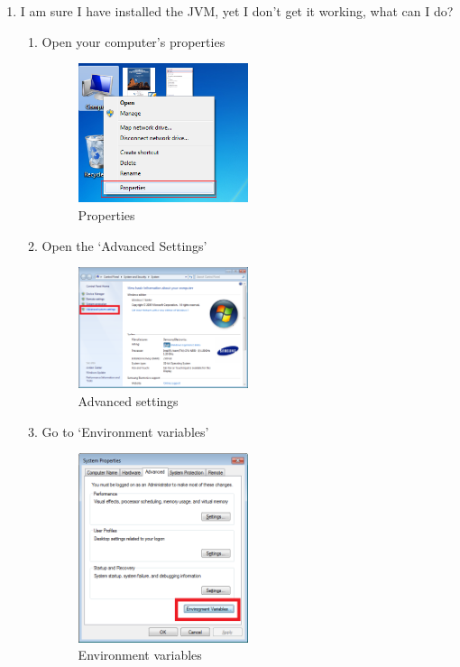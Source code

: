 \begin{enumerate}
	\item I am sure I have installed the JVM, yet I don't get it working, what can I do?
	\begin{enumerate}
		\item Open your computer's properties
		\begin{figure}[H]\label{fig:properties}
		\centering
		\includegraphics[width=0.5\textwidth]{img/step-by-step-win/3-computer-properties}
		\caption{Properties}
		\end{figure}
		
		\item Open the `Advanced Settings'
		\begin{figure}[H]\label{fig:advanced-settings}
		\centering
		\includegraphics[width=0.5\textwidth]{img/step-by-step-win/4-advanced-settings}
		\caption{Advanced settings}
		\end{figure}
		
		\item Go to `Environment variables'
		\begin{figure}[H]\label{fig:variables}
		\centering
		\includegraphics[width=0.5\textwidth]{img/step-by-step-win/5-environment-variables}
		\caption{Environment variables}
		\end{figure}
		

\end{enumerate}
\end{enumerate}
